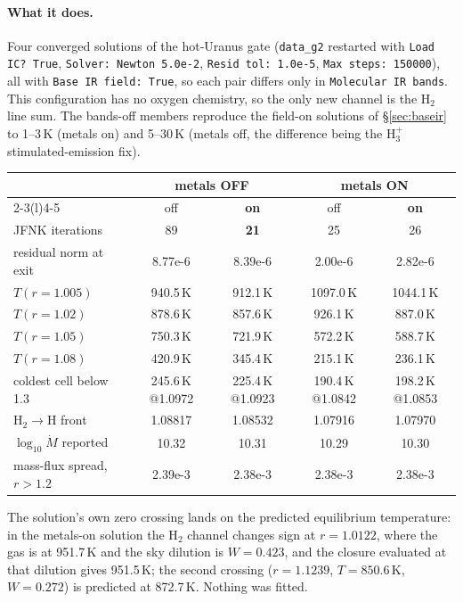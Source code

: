 \documentclass[english,a4paper]{my_memo}
\newcommand{\Mdot}{\dot{M}}
\begin{document}
\paragraph{What it does.}
Four converged solutions of the hot-Uranus gate (\texttt{data\_g2} restarted
with \texttt{Load IC? True}, \texttt{Solver: Newton 5.0e-2},
\texttt{Resid tol: 1.0e-5}, \texttt{Max steps: 150000}), all with
\texttt{Base IR field: True}, so each pair differs only in
\texttt{Molecular IR bands}. This configuration has no oxygen chemistry, so the
only new channel is the H$_2$ line sum. The bands-off members reproduce the
field-on solutions of \S\ref{sec:baseir} to 1--3\,K (metals on) and 5--30\,K
(metals off, the difference being the H$_3^+$ stimulated-emission fix).

\begin{center}\small
\begin{tabular}{lcc@{\qquad}cc}
\toprule
 & \multicolumn{2}{c}{metals OFF} & \multicolumn{2}{c}{metals ON} \\
\cmidrule(r){2-3}\cmidrule(l){4-5}
 & off & \textbf{on} & off & \textbf{on} \\
\midrule
JFNK iterations         & 89 & \textbf{21} & 25 & 26 \\
residual norm at exit   & 8.77e-6 & 8.39e-6 & 2.00e-6 & 2.82e-6 \\
$T(r=1.005)$            & 940.5\,K & 912.1\,K & 1097.0\,K & 1044.1\,K \\
$T(r=1.02)$             & 878.6\,K & 857.6\,K & 926.1\,K  & 887.0\,K \\
$T(r=1.05)$             & 750.3\,K & 721.9\,K & 572.2\,K  & 588.7\,K \\
$T(r=1.08)$             & 420.9\,K & 345.4\,K & 215.1\,K  & 236.1\,K \\
coldest cell below 1.3  & 245.6\,K @1.0972 & 225.4\,K @1.0923 & 190.4\,K @1.0842 & 198.2\,K @1.0853 \\
H$_2\to$H front         & 1.08817 & 1.08532 & 1.07916 & 1.07970 \\
$\log_{10}\Mdot$ reported & 10.32 & 10.31 & 10.29 & 10.30 \\
mass-flux spread, $r>1.2$ & 2.39e-3 & 2.38e-3 & 2.38e-3 & 2.38e-3 \\
\bottomrule
\end{tabular}
\end{center}

\noindent The solution's own zero crossing lands on the predicted equilibrium
temperature: in the metals-on solution the H$_2$ channel changes sign at
$r=1.0122$, where the gas is at 951.7\,K and the sky dilution is $W=0.423$, and
the closure evaluated at that dilution gives 951.5\,K; the second crossing
($r=1.1239$, $T=850.6$\,K, $W=0.272$) is predicted at 872.7\,K. Nothing was
fitted.
\end{document}
